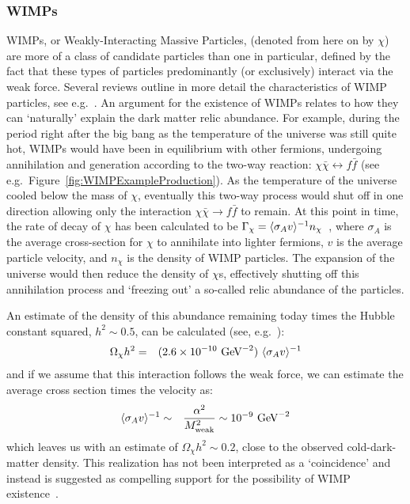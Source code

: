 			\subsubsection{WIMPs}
 WIMPs, or Weakly-Interacting Massive Particles, (denoted from here on by $\chi$) are more of a class of candidate particles than one in particular, defined by the fact that these types of particles predominantly (or exclusively) interact via the weak force.  Several reviews outline in more detail the characteristics of WIMP particles, see e.g.~\cite{Jun96,Lew96}.  An argument for the existence of WIMPs relates to how they can `naturally' explain the dark matter relic abundance.
  For example, during the period right after the big bang as the temperature of the universe was still quite hot, WIMPs would have been in equilibrium with other fermions, undergoing annihilation and generation according to the two-way reaction: $\chi\bar{\chi} \leftrightarrow f\bar{f} $ (see e.g.~Figure~\ref{fig:WIMPExampleProduction}).  As the temperature of the universe cooled below the mass of $\chi$, eventually this two-way process would shut off in one direction allowing only the interaction $\chi\bar{\chi} \rightarrow f\bar{f} $ to remain.  At this point in time, the rate of decay of $\chi$ has been calculated to be $\Gamma_{\chi} = \langle \sigma_{A} v \rangle^{-1} n_{\chi}$~\cite{Jun96}, where $\sigma_{A}$ is the average cross-section for $\chi$ to annihilate into lighter fermions, $v$ is the average particle velocity, and $n_{\chi}$ is the density of WIMP particles.  The expansion of the universe would then reduce the density of $\chi$s, effectively shutting off this annihilation process and `freezing out' a so-called relic abundance of the particles.  

An estimate of the density of this abundance remaining today times the Hubble constant squared, $h^{2}\sim0.5$, can be calculated (see, e.g.~\cite{Jun96}):
			\begin{eqnarray}
				\Omega_{\chi} h^{2} & = & (2.6 \times 10^{-10}~\text{GeV}^{-2})~\langle \sigma_{A} v \rangle^{-1} \\
			\end{eqnarray}
and if we assume that this interaction follows the weak force, we can estimate the average cross section times the velocity as:
			\begin{eqnarray}
				\langle \sigma_{A} v \rangle^{-1} & \sim & \frac{\alpha^{2}}{M_{\text{weak}}^{2}} \sim 10^{-9}~\text{GeV}^{-2}\\			
			\end{eqnarray}
which leaves us with an estimate of 	$\Omega_{\chi} h^{2} \sim 0.2$, close to the observed cold-dark-matter density.  This realization has not been interpreted as a `coincidence' and instead is suggested as compelling support for the possibility of WIMP existence~\cite{Feng20052}.  
		
